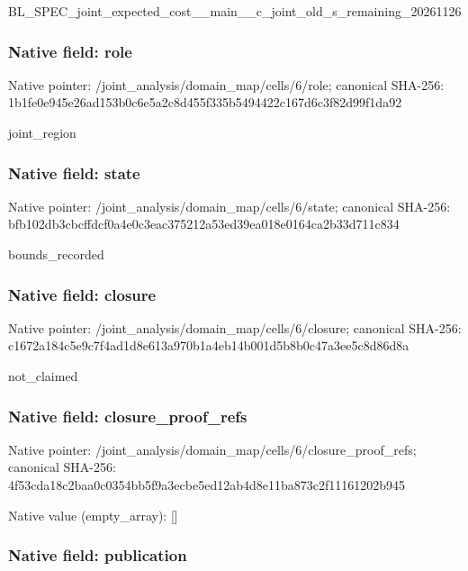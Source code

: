 \documentclass[10pt,a4paper]{article}
\begin{document}
BL\_SPEC\_joint\_expected\_c\allowbreak{}ost\_\_main\_\_c\_joint\_old\_s\allowbreak{}\_remaining\_20261126


\subsubsection{Native field: role}


Native pointer: /joint\_analysis/domain\_map/cells/6/role; canonical SHA-256: 1b1fe0e945e26ad153b0c6e5\allowbreak{}a2c8d455f335b5494422c167\allowbreak{}d6c3f82d99f1da92


joint\_region


\subsubsection{Native field: state}


Native pointer: /joint\_analysis/domain\_m\allowbreak{}ap/cells/6/state; canonical SHA-256: bfb102db3cbcffdcf0a4e0c3\allowbreak{}eac375212a53ed39ea018e01\allowbreak{}64ca2b33d711c834


bounds\_recorded


\subsubsection{Native field: closure}


Native pointer: /joint\_analysis/domain\_m\allowbreak{}ap/cells/6/closure; canonical SHA-256: c1672a184c5e9c7f4ad1d8e6\allowbreak{}13a970b1a4eb14b001d5b8b0\allowbreak{}c47a3ee5c8d86d8a


not\_claimed


\subsubsection{Native field: closure\_proof\_refs}


Native pointer: /joint\_analysis/domain\_m\allowbreak{}ap/cells/6/closure\_proof\allowbreak{}\_refs; canonical SHA-256: 4f53cda18c2baa0c0354bb5f\allowbreak{}9a3ecbe5ed12ab4d8e11ba87\allowbreak{}3c2f11161202b945



Native value (empty\_array): []



\subsubsection{Native field: publication}
\end{document}
